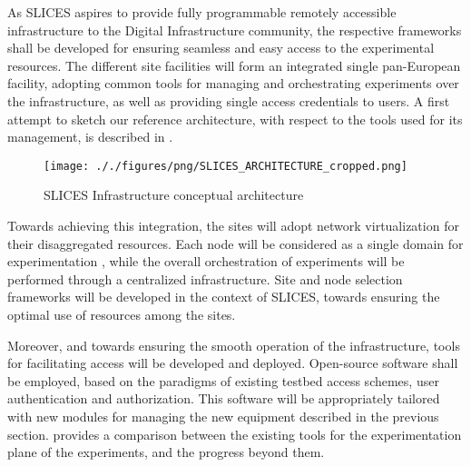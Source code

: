 As SLICES aspires to provide fully programmable remotely accessible infrastructure to the Digital Infrastructure community, the respective frameworks shall be developed for ensuring seamless and easy access to the experimental resources. The different site facilities will form an integrated single pan-European facility, adopting common tools for managing and orchestrating experiments over the infrastructure, as well as providing single access credentials to users. A first attempt to sketch our reference architecture, with respect to the tools used for its management, is described in .

\begin{figure*}[t]
    \centering
    \texttt{[image: ././figures/png/SLICES\_ARCHITECTURE\_cropped.png]}
	\caption{SLICES Infrastructure conceptual architecture}
	\label{fig:SLICES-conceptual-architecture}
\end{figure*}


Towards achieving this integration, the sites will adopt network virtualization for their disaggregated resources. Each node will be considered as a single domain for experimentation \cite{bernini2020multi}, while the overall orchestration of experiments will be performed through a centralized infrastructure. Site and node selection frameworks will be developed in the context of SLICES, towards ensuring the optimal use of resources among the sites. 

Moreover, and towards ensuring the smooth operation of the infrastructure, tools for facilitating access will be developed and deployed. Open-source software shall be employed, based on the paradigms of existing testbed access schemes, user authentication and authorization. This software will be appropriately tailored with new modules for managing the new equipment described in the previous section. 
 provides a comparison between the existing tools for the experimentation plane of the experiments, and the progress beyond them.





